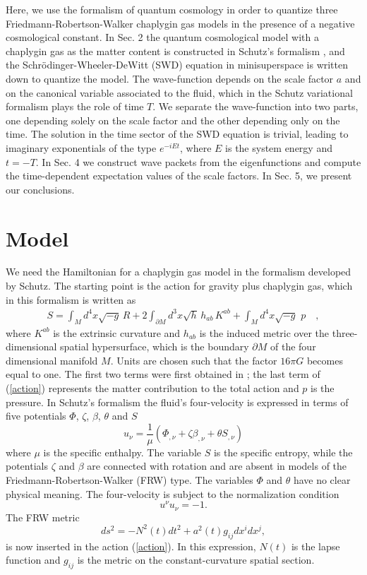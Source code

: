 Here, we use the formalism of quantum cosmology in order to quantize three
Friedmann-Robertson-Walker chaplygin gas models in the presence of a negative cosmological
constant. In Sec. 2 the quantum cosmological model with a chaplygin gas as the matter content is
constructed in Schutz's formalism \cite{20}, and the Schr\"odinger-Wheeler-DeWitt (SWD) equation in
minisuperspace is written down to quantize the model. The wave-function depends on the scale factor
$a$ and on the canonical variable associated to the fluid, which in the Schutz variational
formalism plays the role of time $T$. We separate the wave-function into two parts, one depending
solely on the scale factor and the other depending only on the time. The solution in the time
sector of the SWD equation is trivial, leading to imaginary exponentials of the type $e^{-iEt}$,
where $E$ is the system energy and $t =- T$. In Sec. 4 we construct wave packets from the
eigenfunctions and compute the time-dependent expectation values of the scale factors. In Sec. 5,
we present our conclusions.

\section{Model}
We need the Hamiltonian for a chaplygin gas model in the formalism developed by Schutz. The starting point is the action for gravity plus chaplygin
gas, which in this formalism is written as
\begin{eqnarray}
\label{action} S = \int_Md^4x\sqrt{-g}\, R + 2\int_{\partial M}d^3x\sqrt{h}\, h_{ab}\, K^{ab} + \int_Md^4x\sqrt{-g}\,\, p \quad ,
\end{eqnarray}
where $K^{ab}$ is the extrinsic curvature and $h_{ab}$ is the induced metric over the
three-dimensional spatial hypersurface, which is the boundary $\partial M$ of the four dimensional
manifold $M$. Units are chosen such that the factor $16\pi G$ becomes equal to one. The first two
terms were first obtained in \cite{7}; the last term of (\ref{action}) represents the matter
contribution to the total action and $p$ is the pressure. In Schutz's formalism \cite{11,12} the
fluid's four-velocity is expressed in terms of five potentials $\Phi$, $\zeta$, $\beta$, $\theta$
and $S$
\begin{equation}
u_\nu = \frac{1}{\mu}(\Phi_{,\nu} + \zeta\beta_{,\nu} + \theta S_{,\nu})
\end{equation}
where $\mu$ is the specific enthalpy. The variable $S$ is the specific entropy, while the potentials $\zeta$ and $\beta$ are connected with rotation
and are absent in models of the Friedmann-Robertson-Walker (FRW) type. The variables $\Phi$ and $\theta$ have no clear physical meaning. The
four-velocity is subject to the normalization condition
\begin{equation}
u^\nu u_\nu = -1.
\end{equation}
The FRW metric
\begin{equation}
ds^2 = - N^2(t)dt^2 + a^2(t)g_{ij}dx^idx^j,
\end{equation}
is now inserted in the action (\ref{action}). In this expression, $N(t)$ is the lapse function and $g_{ij}$ is the metric on the constant-curvature
spatial section.

